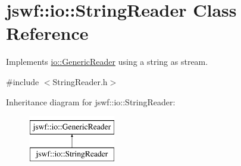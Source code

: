 \hypertarget{classjswf_1_1io_1_1_string_reader}{\section{jswf\+:\+:io\+:\+:String\+Reader Class Reference}
\label{classjswf_1_1io_1_1_string_reader}
}


Implements \hyperlink{classjswf_1_1io_1_1_generic_reader}{io\+::\+Generic\+Reader} using a string as stream.  




{\ttfamily \#include $<$String\+Reader.\+h$>$}

Inheritance diagram for jswf\+:\+:io\+:\+:String\+Reader\+:\begin{figure}[H]
\begin{center}
\leavevmode
\includegraphics[height=2.000000cm]{classjswf_1_1io_1_1_string_reader}
\end{center}
\end{figure}
